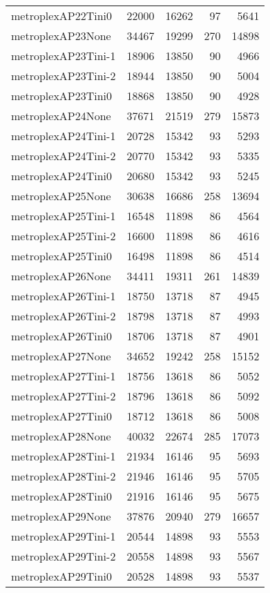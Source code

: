 \begin{longtable}{lrrrr}
metroplexAP22Tini0 & 22000 & 16262 & 97 & 5641 \\
metroplexAP23None & 34467 & 19299 & 270 & 14898 \\
metroplexAP23Tini-1 & 18906 & 13850 & 90 & 4966 \\
metroplexAP23Tini-2 & 18944 & 13850 & 90 & 5004 \\
metroplexAP23Tini0 & 18868 & 13850 & 90 & 4928 \\
metroplexAP24None & 37671 & 21519 & 279 & 15873 \\
metroplexAP24Tini-1 & 20728 & 15342 & 93 & 5293 \\
metroplexAP24Tini-2 & 20770 & 15342 & 93 & 5335 \\
metroplexAP24Tini0 & 20680 & 15342 & 93 & 5245 \\
metroplexAP25None & 30638 & 16686 & 258 & 13694 \\
metroplexAP25Tini-1 & 16548 & 11898 & 86 & 4564 \\
metroplexAP25Tini-2 & 16600 & 11898 & 86 & 4616 \\
metroplexAP25Tini0 & 16498 & 11898 & 86 & 4514 \\
metroplexAP26None & 34411 & 19311 & 261 & 14839 \\
metroplexAP26Tini-1 & 18750 & 13718 & 87 & 4945 \\
metroplexAP26Tini-2 & 18798 & 13718 & 87 & 4993 \\
metroplexAP26Tini0 & 18706 & 13718 & 87 & 4901 \\
metroplexAP27None & 34652 & 19242 & 258 & 15152 \\
metroplexAP27Tini-1 & 18756 & 13618 & 86 & 5052 \\
metroplexAP27Tini-2 & 18796 & 13618 & 86 & 5092 \\
metroplexAP27Tini0 & 18712 & 13618 & 86 & 5008 \\
metroplexAP28None & 40032 & 22674 & 285 & 17073 \\
metroplexAP28Tini-1 & 21934 & 16146 & 95 & 5693 \\
metroplexAP28Tini-2 & 21946 & 16146 & 95 & 5705 \\
metroplexAP28Tini0 & 21916 & 16146 & 95 & 5675 \\
metroplexAP29None & 37876 & 20940 & 279 & 16657 \\
metroplexAP29Tini-1 & 20544 & 14898 & 93 & 5553 \\
metroplexAP29Tini-2 & 20558 & 14898 & 93 & 5567 \\
metroplexAP29Tini0 & 20528 & 14898 & 93 & 5537 \\

\end{longtable}
